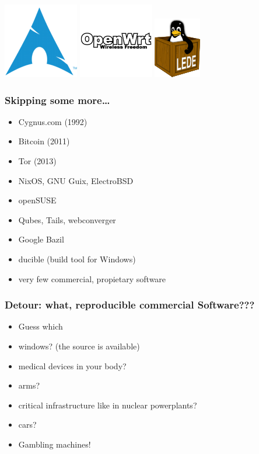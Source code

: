 \documentclass[14pt,aspectratio=169]{beamer}
\begin{document}
\begin{frame}
\begin{center}
  \hspace{0.05\paperwidth}
  \includegraphics[height=0.13\paperheight]{images/archlinux.png}
  \hspace{0.05\paperwidth}
  \includegraphics[height=0.3\paperheight]{images/openwrt.png}
  \hspace{0.05\paperwidth}
  \includegraphics[height=0.15\paperheight]{images/lede.png}
\end{center}
\end{frame}


\begin{frame}
 \frametitle{Skipping some more…}
 \begin{itemize}
\item Cygnus.com (1992)
\item Bitcoin (2011)
\item Tor (2013)
\item NixOS, GNU Guix, ElectroBSD
\item openSUSE
\item Qubes, Tails, webconverger
\item Google Bazil
\item ducible (build tool for Windows)
\item very few commercial, propietary software
 \end{itemize}
\end{frame}


\begin{frame}
 \frametitle{Detour: what, reproducible commercial Software???}
 \begin{itemize}
\item Guess which
\item <2-3>   windows? (the source is available)
\item <2-3>   medical devices in your body?
\item <2-3>   arms?
\item <2-3>   critical infrastructure like in nuclear powerplants?
\item <2-3>   cars?
\item <3> Gambling machines!
 \end{itemize}
\end{frame}
\end{document}
